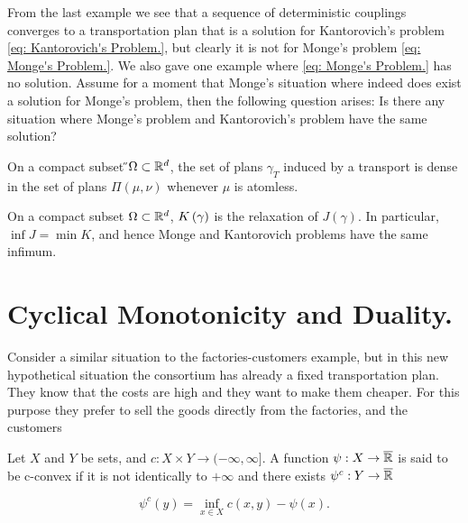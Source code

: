 From the last example we see that a sequence of deterministic couplings converges to a transportation plan that is a solution for Kantorovich's problem \eqref{eq: Kantorovich's Problem.}, but clearly it is not for Monge's problem \eqref{eq: Monge's Problem.}. We also gave one example where \eqref{eq: Monge's Problem.} has no solution. Assume for a moment that Monge's  situation where indeed does exist a solution for Monge's problem, then the following question arises: Is there any situation where Monge's problem and Kantorovich's problem have the same solution?


\begin{lemma}
On a compact subset  ̋$\Omega \subset \mathbb{R}^d$, the set of plans $\gamma_T$ induced by a transport is dense in the set of plans $\Pi(\mu, \nu) $ whenever $\mu$ is atomless.
\end{lemma}
\begin{theorem}
On a compact subset $\Omega \subset \mathbb{R}^d$,  $K\left(\gamma\right)$ is the relaxation of $J(\gamma)$. In particular, $\inf J = \min K$, and hence Monge and Kantorovich problems have the same infimum.
\end{theorem}


\section{Cyclical Monotonicity and Duality.}

Consider a similar situation to the factories-customers example, but in this new hypothetical situation the consortium has already a fixed transportation plan. They know that the costs are high and they want to make them cheaper. For this purpose they prefer to sell the goods directly from the factories, and the customers 

\begin{definition}[c-transform]
	Let $X$ and $Y$ be sets, and $c:X\times Y \rightarrow (-\infty, \infty]$. A function $\psi: X\rightarrow \overline{\mathbb{R}}$ is said to be c-convex if it is not identically to $+\infty$ and there exists $\psi^c: Y \rightarrow \overline{\mathbb{R}}$
	
	\begin{equation}
		\psi^c(y)= \inf_{x\in X} c(x,y)-\psi(x).
	\end{equation}
\end{definition}

